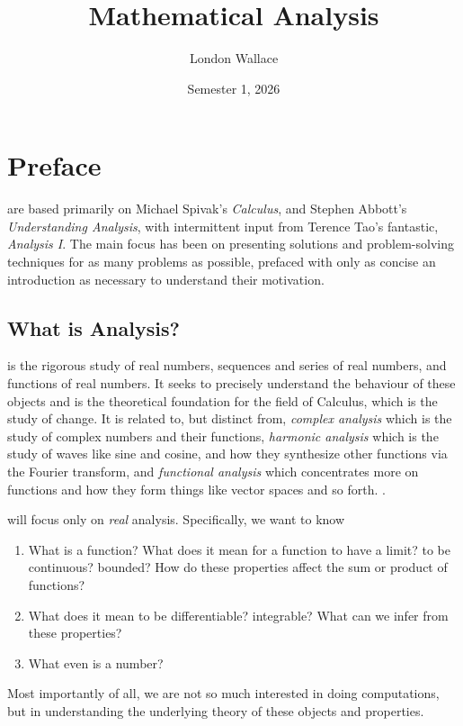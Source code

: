 \documentclass[10pt]{book}
\title{Mathematical Analysis}
\author{London Wallace}
\date{Semester 1, 2026}
\newcommand{\newthought}[1]{\vspace{0.5\baselineskip}\noindent{\scshape #1}}
\begin{document}
\frontmatter
\maketitle
\tableofcontents

\chapter{Preface}
\newthought{These notes} are based primarily on Michael Spivak's \emph{Calculus}, and Stephen Abbott's
\emph{Understanding Analysis}, with intermittent input from Terence Tao's fantastic, \emph{Analysis I}. The main focus
has been on presenting solutions and problem-solving techniques for as many problems as possible, prefaced with only as
concise an introduction as necessary to understand their motivation.

\section{What is Analysis?}

\newthought{Real Analysis} is the rigorous study of real numbers, sequences and series of real numbers, and functions of real
numbers. It seeks to precisely understand the behaviour of these objects and is the theoretical foundation for the field
of Calculus, which is the study of change. It is related to, but distinct from, \emph{complex analysis} which is the study
of complex numbers and their functions, \emph{harmonic analysis} which is the study of waves like sine and cosine, and how
they synthesize other functions via the Fourier transform, and \emph{functional analysis} which concentrates more on functions
and how they form things like vector spaces and so forth. \cite{tao-analysis}.

\newthought{This text} will focus only on \emph{real} analysis. Specifically, we want to know
\begin{enumerate}
  \item What is a function? What does it mean for a function to have a limit? to be continuous? bounded? How do these
    properties affect the sum or product of functions?
  \item What does it mean to be differentiable? integrable? What can we infer from these properties?
  \item What even is a number?
\end{enumerate}
Most importantly of all, we are not so much interested in doing computations, but in understanding the underlying theory
of these objects and properties.
\end{document}
